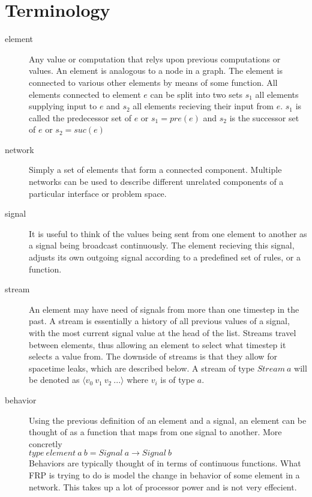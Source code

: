 \documentclass[twocolumn]{paper}
\begin{document}
\section{Terminology}
\begin{description}
\item[element] Any value or computation that relys upon previous computations or values. An element is analogous to a node in a graph. The element is connected to various other elements by means of some function. All elements connected to element $e$ can be split into two sets $s_1$ all elements supplying input to $e$ and $s_2$ all elements recieving their input from $e$. $s_1$ is called the predecessor set of $e$ or $s_1 = pre(e)$ and $s_2$ is the successor set of $e$ or $s_2 = suc(e)$

\item[network] Simply a set of elements that form a connected component. Multiple networks can be used to describe different unrelated components of a particular interface or problem space.

\item[signal] It is useful to think of the values being sent from one element to another as a signal being broadcast continuously. The element recieving this signal, adjusts its own outgoing signal according to a predefined set of rules, or a function.

\item[stream] An element may have need of signals from more than one timestep in the past. A stream is essentially a history of all previous values of a signal, with the most current signal value at the head of the list. Streams travel between elements, thus allowing an element to select what timestep it selects a value from. The downside of streams is that they allow for spacetime leaks, which are described below. A stream of type $Stream~a$ will be denoted as $\langle v_0~v_1~v_2~...\rangle$ where $v_i$ is of type $a$.

\item[behavior] Using the previous definition of an element and a signal, an element can be thought of as a function that maps from one signal to another. More concretly\\
  $type~element~a~b = Signal ~a \rightarrow Signal ~b$\\
  Behaviors are typically thought of in terms of continuous functions. What FRP is trying to do is model the change in behavior of some element in a network. This takes up a lot of processor power  and is not very effecient.


\end{description}
\end{document}
